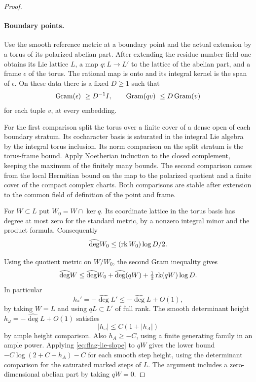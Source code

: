 \begin{proof}
\paragraph{Boundary points.}
Use the smooth reference metric at a boundary point and the actual
extension by a torus of its polarized abelian part. After extending
the residue number field one obtains its Lie lattice \(L\), a map
\(q:L\to L'\) to the lattice of the abelian part, and a frame
\(\epsilon\) of the torus. The rational map is onto and its integral
kernel is the span of \(\epsilon\). On these data there is a fixed
\(D\ge1\) such that
\[
   {\rm Gram}(\epsilon)\ \ge D^{-1}I,\qquad
   {\rm Gram}(qv)\ \le D\,{\rm Gram}(v)
\]
for each tuple \(v\), at every embedding.

For the first comparison
split the torus over a finite cover of a dense open of each
boundary stratum. Its cocharacter basis is saturated in the
integral Lie algebra by the integral torus inclusion. Its norm
comparison on the split stratum is the torus-frame bound. Apply
Noetherian induction to the closed complement, keeping the maximum
of the finitely many bounds. The second comparison comes from the
local Hermitian bound on the map to the polarized quotient and a
finite cover of the compact complex charts. Both comparisons are
stable after extension to the common field of definition of the
point and frame. \label{cor:flag-point-heights-5}

For \(W\subset L\) put \(W_0=W\cap\ker q\). Its coordinate lattice
in the torus basis has degree at most zero for the standard
metric, by a nonzero integral minor and the product formula.
Consequently
\[
 \widehat{\deg}W_0\le(\operatorname{rk} W_0)\log D/2.
\]

Using the quotient metric on \(W/W_0\), the second Gram inequality
gives
\[
 \widehat{\deg}W\le \widehat{\deg}W_0+\widehat{\deg}(qW)
                            +\tfrac12\operatorname{rk}(qW)\log D .
\]
In particular
\[
 h_*'=-\widehat{\deg}L'\le -\widehat{\deg}L+O(1),
\]
by taking \(W=L\) and using
\(qL\subset L'\) of full rank. The smooth determinant height
\(h_\omega=-\widehat{\deg}L+O(1)\) satisfies
\[
 |h_\omega|\le C(1+|h_A|)
\]
by ample height comparison.
Also \(h_A\ge-C\), using a finite generating family in an ample
power. Applying \eqref{eq:flag-lie-slope} to \(qW\) gives the
lower bound \(-C\log(2+C+h_A)-C\) for each smooth step height,
using the determinant comparison for the saturated marked steps
of \(L\). The argument includes a zero-dimensional abelian part
by taking \(qW=0\).


\end{proof}
